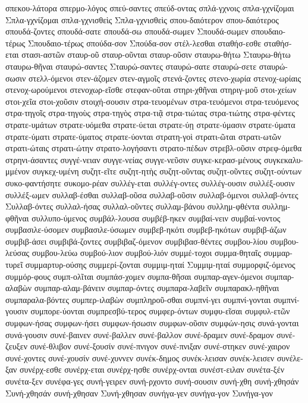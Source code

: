 {σπεκου-λάτορα
σπερμο-λόγος
σπεύ-σαντες
σπεύδ-οντας
σπλά-γχνοις
σπλα-γχνίζομαι
Σπλα-γχνίζομαι
σπλα-γχνισθεὶς
Σπλα-γχνισθεὶς
σπου-δαιότερον
σπου-δαιότερος
σπουδά-ζοντες
σπουδά-σατε
σπουδά-σω
σπουδά-σωμεν
Σπουδά-σωμεν
σπουδαιο-τέρως
Σπουδαιο-τέρως
σπούδα-σον
Σπούδα-σον
στέλ-λεσθαι
σταθήσ-εσθε
σταθήσ-εται
στασι-αστῶν
σταυρ-οῦ
σταυρ-οῦνται
σταυρ-οῦσιν
σταυρω-θήτω
Σταυρω-θήτω
σταυρω-θῆναι
σταυρώ-σαντες
Σταυρώ-σαντες
σταυρώ-σατε
σταυρώ-σετε
σταυρώ-σωσιν
στελλ-όμενοι
στεν-άζομεν
στεν-αγμοῖς
στενά-ζοντες
στενο-χωρία
στενοχ-ωρίαις
στενοχ-ωρούμενοι
στενοχωρ-εῖσθε
στεφαν-οῦται
στηρι-χθῆναι
στηριγ-μοῦ
στοι-χείων
στοι-χεῖα
στοι-χοῦσιν
στοιχή-σουσιν
στρα-τευομένων
στρα-τευόμενοι
στρα-τευόμενος
στρα-τηγοῖς
στρα-τηγοὺς
στρα-τηγὸς
στρα-τιᾷ
στρα-τιώτας
στρα-τιώτης
στρα-φέντες
στρατε-υμάτων
στρατε-υόμεθα
στρατε-ύεται
στρατε-ύῃ
στρατε-ύμασιν
στρατε-ύματα
στρατε-ύματι
στρατε-ύματος
στρατε-ύονται
στρατη-γοὶ
στρατι-ῶται
στρατι-ωτῶν
στρατι-ώταις
στρατι-ώτην
στρατο-λογήσαντι
στρατο-πέδων
στρεβλ-οῦσιν
στρεφ-όμεθα
στρηνι-άσαντες
συγγέ-νειαν
συγγε-νείας
συγγε-νεῦσιν
συγκε-κερασ-μένους
συγκεκαλυ-μμένον
συγκεχ-υμένη
συζητ-εῖτε
συζητ-ητὴς
συζητ-οῦντας
συζητ-οῦντες
συζητ-ούντων
συκο-φαντήσητε
συκομο-ρέαν
συλλέγ-εται
συλλέγ-οντες
συλλέγ-ουσιν
συλλέξ-ουσιν
συλλέξ-ωμεν
συλλαβ-έσθαι
συλλαβ-οῦσα
συλλαβ-οῦσιν
συλλαβ-όμενοι
συλλαβ-όντες
Συλλαβ-όντες
συλλαλ-ήσας
συλλαλ-οῦντες
συλλαμ-βάνου
συλλημ-φθέντα
συλλημ-φθῆναι
συλλυπο-ύμενος
συμβάλ-λουσα
συμβέβ-ηκεν
συμβαί-νειν
συμβαί-νοντος
συμβασιλε-ύσομεν
συμβασιλε-ύσωμεν
συμβεβ-ηκότι
συμβεβ-ηκότων
συμβιβ-άζων
συμβιβ-άσει
συμβιβά-ζοντες
συμβιβαζ-όμενον
συμβιβασ-θέντες
συμβου-λίου
συμβου-λεύσας
συμβου-λεύω
συμβού-λιον
συμβού-λιόν
συμμέ-τοχοι
συμμα-θηταῖς
συμμαρ-τυρεῖ
συμμαρτυρ-ούσης
συμμερί-ζονται
συμμιμ-ηταί
Συμμιμ-ηταί
συμμορφιζ-όμενος
συμμόρ-φους
συμπ-ολῖται
συμπάσ-χομεν
συμπα-θῆσαι
συμπαρ-αγεν-όμενοι
συμπαρ-αλαβὼν
συμπαρ-αλαμ-βάνειν
συμπαρ-όντες
συμπαρα-λαβεῖν
συμπαρακλ-ηθῆναι
συμπαραλα-βόντες
συμπερ-ιλαβὼν
συμπληροῦ-σθαι
συμπνί-γει
συμπνί-γονται
συμπνί-γουσιν
συμπορε-ύονται
συμπρεσβύ-τερος
συμφερ-όντων
συμφυ-εῖσαι
συμφυλ-ετῶν
συμφων-ήσας
συμφων-ήσει
συμφων-ήσωσιν
συμφων-οῦσιν
συμφών-ησις
συνά-γονται
συνά-γουσιν
συνέ-βαινεν
συνέ-βαλλεν
συνέ-βαλλον
συνέ-δραμεν
συνέ-δραμον
συνέ-ζευξεν
συνέ-θλιβον
συνέ-ξουσίν
συνέ-πνιγον
συνέ-πνιξαν
συνέ-στηκεν
συνέ-χαιρον
συνέ-χοντες
συνέ-χουσίν
συνέ-χυννεν
συνέκ-δημος
συνέκ-λεισαν
συνέκ-λεισεν
συνέλε-ξαν
συνέρχ-εσθε
συνέρχ-εται
συνέρχ-ησθε
συνέρχ-ονται
συνέστ-ειλαν
συνέτα-ξέν
συνέτα-ξεν
συνέφα-γες
συνή-γειρεν
συνή-ρχοντο
συνή-σουσιν
συνή-χθη
συνή-χθησάν
Συνή-χθησάν
συνή-χθησαν
Συνή-χθησαν
συνήγα-γεν
συνήγα-γον
Συνήγα-γον
}

